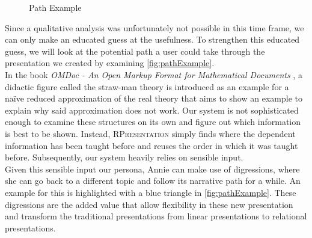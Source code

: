 \documentclass[twoside, 12pt]{article}
\newcommand{\sys}{\textsc{RPresentation}\xspace}
\begin{document}
\begin{figure}
\vspace{-28pt}
  \begin{center}
\vspace{-20pt}
  \caption{Path Example}
  \label{fig:pathExample}
\vspace{-40pt}
  \end{center}
\end{figure}

Since a qualitative analysis was unfortunately not possible in this time frame, we can only make an educated guess at the usefulness. To strengthen this educated guess, we will look at the potential path a user could take through the presentation we created by examining \autoref{fig:pathExample}.\\

In the book \textit{OMDoc - An Open Markup Format for Mathematical Documents} \cite{URL:omdocspec}, a didactic figure called the straw-man theory is introduced as an example for a na\"{i}ve reduced approximation of the real theory that aims to show an example to explain why said approximation does not work. Our system is not sophisticated enough to examine these structures on its own and figure out which information is best to be shown. Instead, \sys simply finds where the dependent information has been taught before and reuses the order in which it was taught before. Subsequently, our system heavily relies on sensible input.\\

Given this sensible input our persona, Annie can make use of digressions, where she can go back to a different topic and follow its narrative path for a while. An example for this is highlighted with a blue triangle in \autoref{fig:pathExample}. These digressions are the added value that allow flexibility in these new presentation and transform the traditional presentations from linear presentations to relational presentations.
\end{document}
